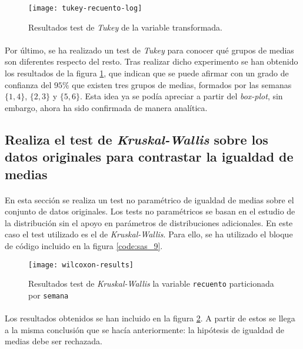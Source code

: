 \documentclass[11pt]{article}
\begin{document}
      \begin{figure}[!h]
        \centering
        \texttt{[image: tukey-recuento-log]}
        \caption{Resultados test de \emph{Tukey} de la variable transformada.}
        \label{img:tukey-recuento-log}
      \end{figure}

      \paragraph{}
      Por último, se ha realizado un test de \emph{Tukey} para conocer qué grupos de medias son diferentes respecto del resto. Tras realizar dicho experimento se han obtenido los resultados de la figura \ref{img:tukey-recuento-log}, que indican que se puede afirmar con un grado de confianza del $95\%$ que existen tres grupos de medias, formados por las semanas $\{1,4\}$, $\{2,3\}$ y $\{5,6\}$. Esta idea ya se podía apreciar a partir del \emph{box-plot}, sin embargo, ahora ha sido confirmada de manera analítica.

    \subsection{Realiza el test de \emph{Kruskal-Wallis} sobre los datos originales para contrastar la igualdad de medias}
    \label{sec:e5}

      \paragraph{}
      En esta sección se realiza un test no paramétrico de igualdad de medias sobre el conjunto de datos originales. Los tests no paramétricos se basan en el estudio de la distribución sin el apoyo en parámetros de distribuciones adicionales. En este caso el test utilizado es el de \emph{Kruskal-Wallis}. Para ello, se ha utilizado el bloque de código incluido en la figura \ref{code:sas_9}.

      \begin{figure}[!h]
        \centering
        \texttt{[image: wilcoxon-results]}
        \caption{Resultados test de \emph{Kruskal-Wallis} la variable \texttt{recuento} particionada por \texttt{semana}}
        \label{img:anova-recuento-log}
      \end{figure}

      \paragraph{}
      Los resultados obtenidos se han incluido en la figura \ref{img:anova-recuento-log}. A partir de estos se llega a la misma conclusión que se hacía anteriormente: la hipótesis de igualdad de medias debe ser rechazada.
\end{document}

